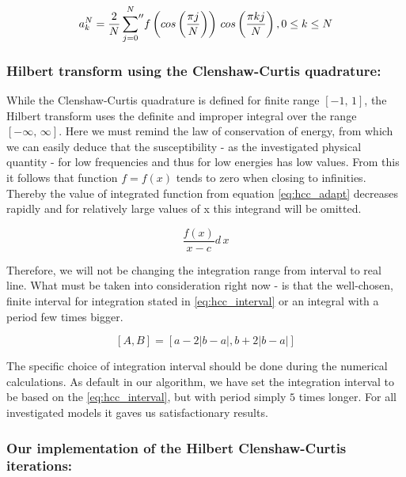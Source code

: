 \documentclass[12pt,twoside,a4paper]{article}
\numberwithin{equation}{subsection}
\numberwithin{figure}{subsection}
\begin{document}
\begin{equation} \label{eq:hcc_akn}
    a_k^N = \frac{2}{N} {\sideset{}{''}\sum_{j=0}^{N}} f\left(cos\left (\frac {\pi j}{N} \right)
    \right)\,cos\left(\frac{\pi k j}{N}\right), 0 \leq k \leq N
\end{equation}


\subsubsection*{Hilbert transform using the Clenshaw-Curtis quadrature:}

While the Clenshaw-Curtis quadrature is defined for finite range $[-1,\,1]$, the Hilbert transform uses the definite and improper
integral over the range $[-\infty,\, \infty]$. Here we must remind the law of conservation of energy, from which we can easily
deduce that the susceptibility - as the investigated physical quantity - for low frequencies and thus for low energies has low
values. From this it follows that function $f = f(x)$ tends to zero when closing to infinities. Thereby the value of integrated
function from equation \ref{eq:hcc_adapt} decreases rapidly and for relatively large values of x this integrand will be omitted.

\begin{equation} \label{eq:hcc_adapt}
  \frac{f(x)}{x-c} d \, x
\end{equation}

Therefore, we will not be changing the integration range from interval to real line. What must be taken into consideration right
now - is that the well-chosen, finite interval for integration stated in \ref{eq:hcc_interval} or an integral with a period few times bigger.

\begin{equation} \label{eq:hcc_interval}
  [A, B] = [a - 2|b-a|, b + 2|b-a|] 
\end{equation}

The specific choice of integration interval should be done during the numerical calculations. As default in our algorithm, we have
set the integration interval to be based on the \ref{eq:hcc_interval}, but with period simply $5$ times longer. For all
investigated models it gaves us satisfactionary results.

\subsubsection*{Our implementation of the Hilbert Clenshaw-Curtis iterations:}
\end{document}
